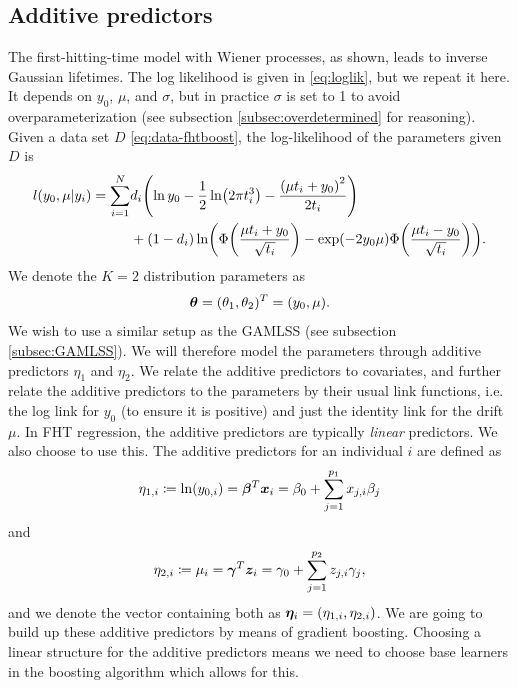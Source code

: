 \subsection{Additive predictors}
The first-hitting-time model with Wiener processes, as shown, leads to inverse Gaussian lifetimes.
The log likelihood is given in \eqref{eq:loglik}, but we repeat it here.
It depends on $y_0$, $\mu$, and $\sigma$, but in practice $\sigma$ is set to 1 to avoid overparameterization (see subsection \ref{subsec:overdetermined} for reasoning).
Given a data set $D$ \eqref{eq:data-fhtboost}, the log-likelihood of the parameters given $D$ is
\begin{align*}
\begin{split}
    l(y_0,\mu|y_i)=\sum_{i=1}^N&d_i\p*{\ln y_0-\frac{1}{2}\ln\p*{2\pi\ti^3}-\frac{\p*{\mu\ti+y_0}^2}{2\ti}} \\
    &+
    (1-d_i)\ln\p*{\Phi\p*{\frac{\mu\ti+y_0}{\sqrt{\ti}}}-\exp\p*{-2y_0\mu}\Phi\p*{\frac{\mu\ti-y_0}{\sqrt{\ti}}}}.
\end{split}
\end{align*}
We denote the $K=2$ distribution parameters as
\begin{equation*}
    \boldsymbol{\theta}=(\theta_1,\theta_2)^T=(y_0,\mu).
\end{equation*}
We wish to use a similar setup as the GAMLSS (see subsection \ref{subsec:GAMLSS}).
We will therefore model the parameters through additive predictors $\eta_1$ and $\eta_2$.
We relate the additive predictors to covariates, and further relate the additive predictors to the parameters by their usual link functions, i.e. the log link for $y_0$ (to ensure it is positive) and just the identity link for the drift $\mu$.
In FHT regression, the additive predictors are typically \textit{linear} predictors.
We also choose to use this.
The additive predictors for an individual $i$ are defined as
\begin{equation}\label{eq:eta1}
    \eta_{1,i}\coloneqq \ln(y_{0,i})=\boldsymbol{\beta}^T \bm{x}_i=\beta_{0}+\sum_{j=1}^{p_1}x_{j,i}\beta_j
\end{equation}
and
\begin{equation}\label{eq:eta2}
    \eta_{2,i}\coloneqq \mu_{i}=\boldsymbol{\gamma}^T \bm{z}_i=\gamma_{0}+\sum_{j=1}^{p_2}z_{j,i}\gamma_j,
\end{equation}
and we denote the vector containing both as $\boldsymbol{\eta}_i=\left(\eta_{1,i},\eta_{2,i}\right)$.
We are going to build up these additive predictors by means of gradient boosting.
Choosing a linear structure for the additive predictors means we need to choose base learners in the boosting algorithm which allows for this.

